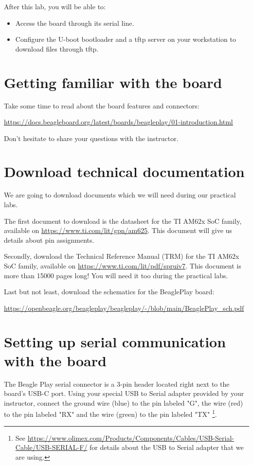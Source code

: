 
After this lab, you will be able to:
\begin{itemize}
\item Access the board through its serial line.
\item Configure the U-boot bootloader and a tftp server
      on your workstation to download files through tftp.
\end{itemize}

\section{Getting familiar with the board}

Take some time to read about the board features and connectors:

\url{https://docs.beagleboard.org/latest/boards/beagleplay/01-introduction.html}

Don't hesitate to share your questions with the instructor.

\section{Download technical documentation}

We are going to download documents which we will need during our
practical labs.

The first document to download is the datasheet for the
TI AM62x SoC family, available on
\url{https://www.ti.com/lit/gpn/am625}. This document will
give us details about pin assignments.

Secondly, download the Technical Reference Manual (TRM) for
the TI AM62x SoC family, available on
\url{https://www.ti.com/lit/pdf/spruiv7}.
This document is more than 15000 pages long! You will need it
too during the practical labs.

Last but not least, download the schematics for the BeaglePlay board:

\url{https://openbeagle.org/beagleplay/beagleplay/-/blob/main/BeaglePlay_sch.pdf}

\section{Setting up serial communication with the board}

The Beagle Play serial connector is a 3-pin header located right next to the
board's USB-C port. Using your special USB to Serial adapter provided  by your
instructor, connect the ground wire (blue) to the pin labeled "G", the
 wire (red) to the pin labeled "RX" and the  wire (green) to
the pin labeled "TX" \footnote{See \url{https://www.olimex.com/Products/Components/Cables/USB-Serial-Cable/USB-SERIAL-F/}
for details about the USB to Serial adapter that we are using.}.

